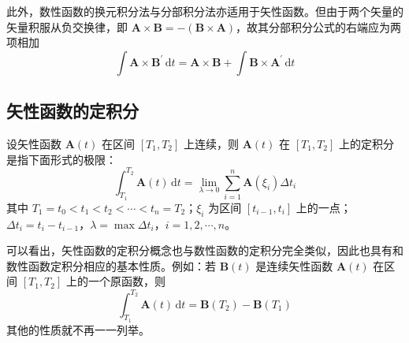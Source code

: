 此外，数性函数的换元积分法与分部积分法亦适用于矢性函数。但由于两个矢量的矢量积服从负交换律，即 $\boldsymbol{A}\times\boldsymbol{B}=-(\boldsymbol{B}\times\boldsymbol{A})$，故其分部积分公式的右端应为两项相加
\begin{equation}
	\label{eq:不定积分:分部积分}
	\int\boldsymbol{A}\times\boldsymbol{B}^{\prime}\,\mathrm{d}t
	=\boldsymbol{A}\times\boldsymbol{B}+\int\boldsymbol{B}\times\boldsymbol{A}^{\prime}\,\mathrm{d}t
\end{equation}

\subsection{矢性函数的定积分}

\begin{definition}[矢性函数的定积分]
	设矢性函数 $\boldsymbol{A}(t)$ 在区间 $\left[T_{1},T_{2}\right]$ 上连续，则 $\boldsymbol{A}(t)$ 在 $\left[T_{1},T_{2}\right]$ 上的定积分是指下面形式的极限：
	\begin{equation}
		\label{eq:定积分:定义}
		\int_{T_{1}}^{T_{2}}\boldsymbol{A}(t)\,\mathrm{d}t
		=\lim_{\lambda\rightarrow 0}\sum_{i=1}^{n}\boldsymbol{A}\left(\xi_{i}\right)\Delta t_{i}
	\end{equation}
	其中 $T_{1}=t_{0}<t_{1}<t_{2}<\cdots<t_{n}=T_{2}$；$\xi_{i}$ 为区间 $\left[t_{i-1},t_{i}\right]$ 上的一点；$\Delta t_{i}=t_{i}-t_{i-1}$，$\lambda=\max\Delta t_{i}$，$i=1,2,\cdots,n$。
\end{definition}

可以看出，矢性函数的定积分概念也与数性函数的定积分完全类似，因此也具有和数性函数定积分相应的基本性质。例如：若 $\boldsymbol{B}(t)$ 是连续矢性函数 $\boldsymbol{A}(t)$ 在区间 $\left[T_{1},T_{2}\right]$ 上的一个原函数，则
\begin{equation}
	\label{eq:定积分:原函数}
	\int_{T_{1}}^{T_{2}}\boldsymbol{A}(t)\,\mathrm{d}t
	=\boldsymbol{B}\left(T_{2}\right)-\boldsymbol{B}\left(T_{1}\right)
\end{equation}
其他的性质就不再一一列举。

